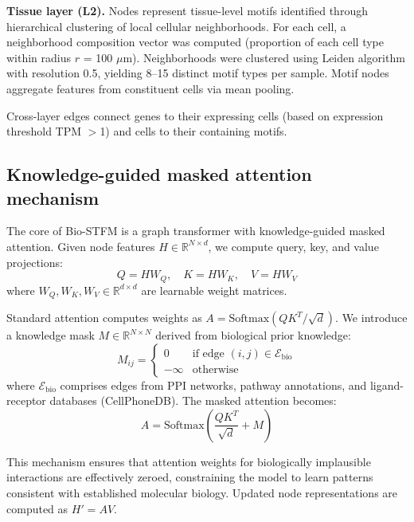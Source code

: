\documentclass[pdflatex,sn-nature]{sn-jnl}%
\theoremstyle{thmstyleone}%
\theoremstyle{thmstyletwo}%
\theoremstyle{thmstylethree}%
\begin{document}
\textbf{Tissue layer (L2).} Nodes represent tissue-level motifs identified through hierarchical clustering of local cellular neighborhoods. For each cell, a neighborhood composition vector was computed (proportion of each cell type within radius $r$ = 100 $\mu$m). Neighborhoods were clustered using Leiden algorithm\cite{bib32} with resolution 0.5, yielding 8--15 distinct motif types per sample. Motif nodes aggregate features from constituent cells via mean pooling.

Cross-layer edges connect genes to their expressing cells (based on expression threshold TPM $>$1) and cells to their containing motifs.

\subsection{Knowledge-guided masked attention mechanism}

The core of Bio-STFM is a graph transformer with knowledge-guided masked attention. Given node features $H \in \mathbb{R}^{N \times d}$, we compute query, key, and value projections:
\begin{equation}
Q = HW_Q, \quad K = HW_K, \quad V = HW_V
\end{equation}
where $W_Q, W_K, W_V \in \mathbb{R}^{d \times d}$ are learnable weight matrices.

Standard attention computes weights as $A = \text{Softmax}(QK^T / \sqrt{d})$. We introduce a knowledge mask $M \in \mathbb{R}^{N \times N}$ derived from biological prior knowledge:
\begin{equation}
M_{ij} = \begin{cases} 0 & \text{if edge } (i,j) \in \mathcal{E}_{\text{bio}} \\ -\infty & \text{otherwise} \end{cases}
\end{equation}
where $\mathcal{E}_{\text{bio}}$ comprises edges from PPI networks, pathway annotations, and ligand-receptor databases (CellPhoneDB\cite{bib29}). The masked attention becomes:
\begin{equation}
A = \text{Softmax}\left(\frac{QK^T}{\sqrt{d}} + M\right)
\end{equation}

This mechanism ensures that attention weights for biologically implausible interactions are effectively zeroed, constraining the model to learn patterns consistent with established molecular biology. Updated node representations are computed as $H' = AV$.
\end{document}
